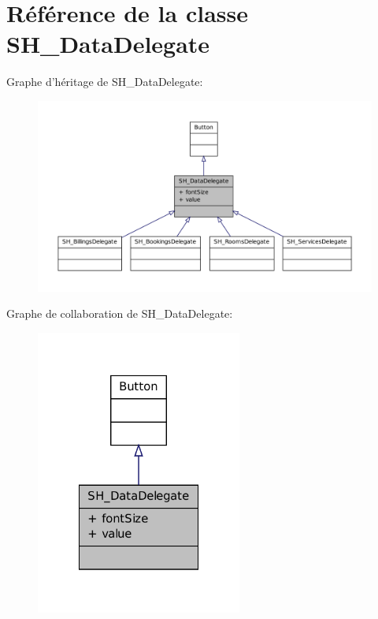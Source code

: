 \hypertarget{classSH__DataDelegate}{\section{Référence de la classe S\-H\-\_\-\-Data\-Delegate}
\label{classSH__DataDelegate}
}


Graphe d'héritage de S\-H\-\_\-\-Data\-Delegate\-:\nopagebreak
\begin{figure}[H]
\begin{center}
\leavevmode
\includegraphics[width=350pt]{classSH__DataDelegate__inherit__graph}
\end{center}
\end{figure}


Graphe de collaboration de S\-H\-\_\-\-Data\-Delegate\-:\nopagebreak
\begin{figure}[H]
\begin{center}
\leavevmode
\includegraphics[width=192pt]{classSH__DataDelegate__coll__graph}
\end{center}
\end{figure}
